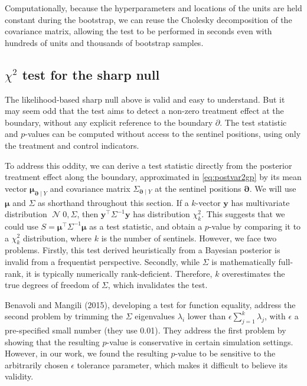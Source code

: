 \documentclass[letter]{article}
\DeclareMathOperator{\normal}{\mathcal{N}}
\newcommand{\trans}{^{\intercal}}
\newcommand{\yvec}{\mathbold{y}}
\newcommand{\muvec}{\mathbold{\mu}}
\newcommand{\boundary}{\partial}
\newcommand{\sentinels}{\bm{\boundary}}
\begin{document}
Computationally, because the hyperparameters and locations of the units
are held constant during the bootstrap, we can reuse the Cholesky
decomposition of the covariance matrix, allowing the test to be
performed in seconds even with hundreds of units and thousands of
bootstrap samples.
    


    	\subsection{\texorpdfstring{\(\chi^2\) test for the sharp
null}{\textbackslash{}chi\^{}2 test for the sharp null}}\label{chi2-test-for-the-sharp-null}

The likelihood-based sharp null above is valid and easy to understand.
But it may seem odd that the test aims to detect a non-zero treatment
effect at the boundary, without any explicit reference to the boundary
\(\boundary\). The test statistic and \(p\)-values can be computed
without access to the sentinel positions, using only the treatment and
control indicators.

To address this oddity, we can derive a test statistic directly from the
posterior treatment effect along the boundary, approximated in
\eqref{eq:postvar2gp} by its mean vector \(\muvec_{\sentinels \mid Y}\)
and covariance matrix \(\Sigma_{\sentinels \mid Y}\) at the sentinel
positions \(\sentinels\). We will use \(\muvec\) and \(\Sigma\) as
shorthand throughout this section. If a \(k\)-vector \(\yvec\) has
multivariate distribution \(\normal{0, \Sigma}\), then
\(\yvec\trans \Sigma^{-1} \yvec\) has distribution \(\chi^2_k\). This
suggests that we could use \(S=\muvec\trans \Sigma^{-1} \muvec\) as a
test statistic, and obtain a \(p\)-value by comparing it to a
\(\chi^2_k\) distribution, where \(k\) is the number of sentinels.
However, we face two problems. Firstly, this test derived heuristically
from a Bayesian posterior is invalid from a frequentist perspective.
Secondly, while \(\Sigma\) is mathematically full-rank, it is typically
numerically rank-deficient. Therefore, \(k\) overestimates the true
degrees of freedom of \(\Sigma\), which invalidates the test.

Benavoli and Mangili (2015), developing a test for function equality,
address the second problem by trimming the \(\Sigma\) eigenvalues
\(\lambda_i\) lower than \(\epsilon \sum_{j=1}^k \lambda_j\), with
\(\epsilon\) a pre-specified small number (they use 0.01). They address
the first problem by showing that the resulting \(p\)-value is
conservative in certain simulation settings. However, in our work, we
found the resulting \(p\)-value to be sensitive to the arbitrarily
chosen \(\epsilon\) tolerance parameter, which makes it difficult to
believe its validity.
\end{document}
